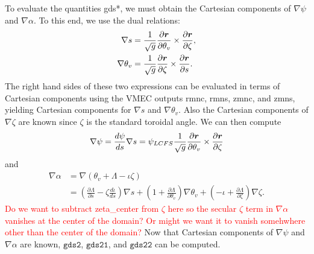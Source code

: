 \documentclass[11pt,letter]{article}
\newcommand{\vect}[1]{\mbox{\boldmath $#1$}}
\newcommand{\todo}[1]{\textcolor{red}{#1}}
\newcommand{\gdstwo}{\mathtt{gds2}}
\newcommand{\gdstwoone}{\mathtt{gds21}}
\newcommand{\gdstwotwo}{\mathtt{gds22}}
\begin{document}
To evaluate the quantities {\ttfamily gds*}, we must obtain the Cartesian components of
$\nabla\psi$ and $\nabla \alpha$. To this end, we use the dual relations:
\begin{align}
\nabla s &=  \frac{1}{\sqrt{g}} \frac{\partial\vect{r}}{\partial\theta_v} \times \frac{\partial\vect{r}}{\partial\zeta}, \label{eq:nabla_s}\\
\nabla\theta_v &= \frac{1}{\sqrt{g}} \frac{\partial\vect{r}}{\partial\zeta} \times \frac{\partial\vect{r}}{\partial s}
\label{eq:nabla_theta}.
\end{align}
The right hand sides of these two expressions can be evaluated in terms of Cartesian components using the VMEC
outputs {\ttfamily rmnc}, {\ttfamily rmns}, {\ttfamily zmnc}, and {\ttfamily zmns}, yielding
Cartesian components for $\nabla s$ and $\nabla\theta_v$. Also the Cartesian components of $\nabla\zeta$
are known since $\zeta$ is the standard toroidal angle.
We can then compute
\begin{equation}
\nabla\psi = \frac{d\psi}{ds} \nabla s = \psi_{LCFS}  \frac{1}{\sqrt{g}} \frac{\partial\vect{r}}{\partial\theta_v} \times \frac{\partial\vect{r}}{\partial\zeta}
\end{equation}
and
\begin{align}
\nabla\alpha 
&= \nabla(\theta_v + \Lambda - \iota \zeta) \nonumber \\
&= \left(\frac{\partial\Lambda}{\partial s} - \zeta \frac{d\iota}{ds}\right)\nabla s
+ \left( 1 + \frac{\partial\Lambda}{\partial\theta_v}\right) \nabla\theta_v
+ \left( -\iota + \frac{\partial\Lambda}{\partial\zeta}\right) \nabla\zeta.
\label{eq:grad_alpha}
\end{align}
\todo{Do we want to subtract {\ttfamily zeta\_center} from $\zeta$ here so the secular $\zeta$ term in $\nabla\alpha$ vanishes at the center of the domain? Or might we want it to vanish somehwhere other than the center of the domain?}
Now that Cartesian components of $\nabla\psi$ and $\nabla \alpha$ are known, $\gdstwo$, $\gdstwoone$, and $\gdstwotwo$ can be computed. 
\end{document}
